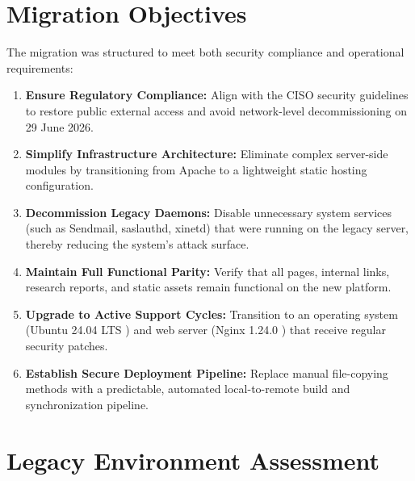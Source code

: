 \documentclass[11pt,a4paper,DIV=16,headings=normal,parskip=half]{scrartcl}
\begin{document}
\section{Migration Objectives}

The migration was structured to meet both security compliance and operational requirements:

\begin{enumerate}
\item \textbf{Ensure Regulatory Compliance:} Align with the CISO security guidelines to restore public external access and avoid network-level decommissioning on 29 June 2026.
\item \textbf{Simplify Infrastructure Architecture:} Eliminate complex server-side modules by transitioning from Apache to a lightweight static hosting configuration.
\item \textbf{Decommission Legacy Daemons:} Disable unnecessary system services (such as Sendmail, saslauthd, xinetd) that were running on the legacy server, thereby reducing the system's attack surface.
\item \textbf{Maintain Full Functional Parity:} Verify that all pages, internal links, research reports, and static assets remain functional on the new platform.
\item \textbf{Upgrade to Active Support Cycles:} Transition to an operating system (Ubuntu 24.04 LTS \cite{ubuntu-lts}) and web server (Nginx 1.24.0 \cite{nginx-docs}) that receive regular security patches.
\item \textbf{Establish Secure Deployment Pipeline:} Replace manual file-copying methods with a predictable, automated local-to-remote build and synchronization pipeline.
\end{enumerate}

\section{Legacy Environment Assessment}
\end{document}
